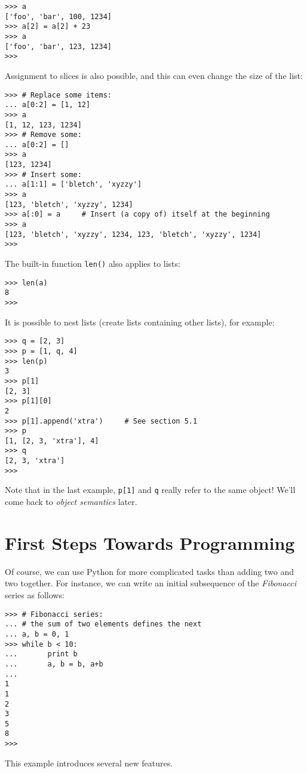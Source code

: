 \bcode\begin{verbatim}
>>> a
['foo', 'bar', 100, 1234]
>>> a[2] = a[2] + 23
>>> a
['foo', 'bar', 123, 1234]
>>>
\end{verbatim}\ecode
%
Assignment to slices is also possible, and this can even change the size
of the list:

\bcode\begin{verbatim}
>>> # Replace some items:
... a[0:2] = [1, 12]
>>> a
[1, 12, 123, 1234]
>>> # Remove some:
... a[0:2] = []
>>> a
[123, 1234]
>>> # Insert some:
... a[1:1] = ['bletch', 'xyzzy']
>>> a
[123, 'bletch', 'xyzzy', 1234]
>>> a[:0] = a     # Insert (a copy of) itself at the beginning
>>> a
[123, 'bletch', 'xyzzy', 1234, 123, 'bletch', 'xyzzy', 1234]
>>> 
\end{verbatim}\ecode
%
The built-in function {\tt len()} also applies to lists:

\bcode\begin{verbatim}
>>> len(a)
8
>>> 
\end{verbatim}\ecode
%
It is possible to nest lists (create lists containing other lists),
for example:

\bcode\begin{verbatim}
>>> q = [2, 3]
>>> p = [1, q, 4]
>>> len(p)
3
>>> p[1]
[2, 3]
>>> p[1][0]
2
>>> p[1].append('xtra')     # See section 5.1
>>> p
[1, [2, 3, 'xtra'], 4]
>>> q
[2, 3, 'xtra']
>>>
\end{verbatim}\ecode
%
Note that in the last example, {\tt p[1]} and {\tt q} really refer to
the same object!  We'll come back to {\em object semantics} later.

\section{First Steps Towards Programming}

Of course, we can use Python for more complicated tasks than adding
two and two together.  For instance, we can write an initial
subsequence of the {\em Fibonacci} series as follows:

\bcode\begin{verbatim}
>>> # Fibonacci series:
... # the sum of two elements defines the next
... a, b = 0, 1
>>> while b < 10:
...       print b
...       a, b = b, a+b
... 
1
1
2
3
5
8
>>> 
\end{verbatim}\ecode
%
This example introduces several new features.

